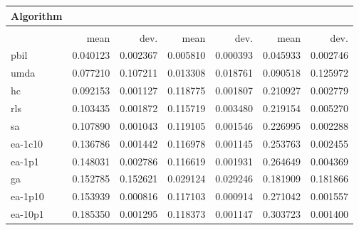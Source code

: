 \begin{tabular}{@{} l *{6}{>{{}}N{1}{2}} @{}}
\toprule
{Algorithm} &  \\
\midrule
&  &  &  \\
\midrule
& {mean} & {dev.} & {mean} & {dev.} & {mean} & {dev.} \\
\midrule
pbil & 0.040123 & 0.002367 & 0.005810 & 0.000393 & 0.045933 & 0.002746 \\
umda & 0.077210 & 0.107211 & 0.013308 & 0.018761 & 0.090518 & 0.125972 \\
hc & 0.092153 & 0.001127 & 0.118775 & 0.001807 & 0.210927 & 0.002779 \\
rls & 0.103435 & 0.001872 & 0.115719 & 0.003480 & 0.219154 & 0.005270 \\
sa & 0.107890 & 0.001043 & 0.119105 & 0.001546 & 0.226995 & 0.002288 \\
ea-1c10 & 0.136786 & 0.001442 & 0.116978 & 0.001145 & 0.253763 & 0.002455 \\
ea-1p1 & 0.148031 & 0.002786 & 0.116619 & 0.001931 & 0.264649 & 0.004369 \\
ga & 0.152785 & 0.152621 & 0.029124 & 0.029246 & 0.181909 & 0.181866 \\
ea-1p10 & 0.153939 & 0.000816 & 0.117103 & 0.000914 & 0.271042 & 0.001557 \\
ea-10p1 & 0.185350 & 0.001295 & 0.118373 & 0.001147 & 0.303723 & 0.001400 \\
\bottomrule
\end{tabular}
